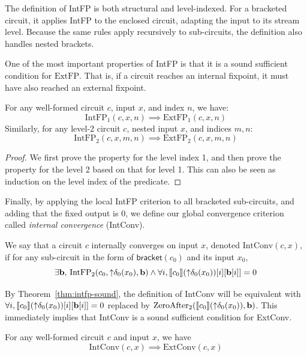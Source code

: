 The definition of IntFP is both structural and level-indexed. For a bracketed circuit, it applies IntFP to the enclosed circuit, adapting the input to its stream level. Because the same rules apply recursively to sub-circuits, the definition also handles nested brackets.

One of the most important properties of IntFP is that it is a sound sufficient condition for $\text{ExtFP}$. That is, if a circuit reaches an internal fixpoint, it must have also reached an external fixpoint.

\begin{theorem}\label{thm:intfp-sound}
    For any well-formed circuit $c$, input $x$, and index $n$, we have:
    \[ \text{IntFP}_1(c, x, n) \implies \text{ExtFP}_1(c, x, n) \]
    Similarly, for any level-2 circuit $c$, nested input $x$, and indices $m, n$:
    \[ \text{IntFP}_2(c, x, m, n) \implies \text{ExtFP}_2(c, x, m, n) \]
\end{theorem}
\begin{proof}
    We first prove the property for the level index 1, and then prove the property for the level 2 based on that for level 1. This can also be seen as induction on the level index of the predicate.
\end{proof}

Finally, by applying the local IntFP criterion to all bracketed sub-circuits, and adding that the fixed output is 0, we define our global convergence criterion called \emph{internal convergence} (IntConv).

\begin{definition}\label{def:intconv}
    We say that a circuit $c$ internally converges on input $x$, denoted $\text{IntConv}(c, x)$, if for any sub-circuit in the form of $\mathsf{bracket}(c_0)$ and its input $x_0$,
    \[\exists \mathbf{b},\, \text{IntFP}_2(c_0, {\uparrow}\delta_0(x_0), \mathbf{b}) \land \forall i, \llbracket c_0 \rrbracket({\uparrow}\delta_0(x_0))[i][\mathbf{b}[i]] = 0\]
\end{definition}

By Theorem~\ref{thm:intfp-sound}, the definition of IntConv will be equivalent with $\forall i, \llbracket c_0 \rrbracket({\uparrow}\delta_0(x_0))[i][\mathbf{b}[i]] = 0$ replaced by $\text{ZeroAfter}_2(\llbracket c_0 \rrbracket({\uparrow}\delta_0(x_0)), \mathbf{b})$. This immediately implies that IntConv is a sound sufficient condition for ExtConv.
\begin{theorem}\label{thm:intconv-sound}
    For any well-formed circuit $c$ and input $x$, we have
    \[\text{IntConv}(c, x) \implies \text{ExtConv}(c, x)\]
\end{theorem}

